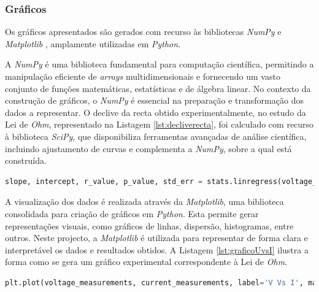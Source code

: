 \subsubsection{Gráficos}
\label{sec:graficos}
Os gráficos apresentados são gerados com recurso às bibliotecas \textit{NumPy} \cite{NumPy} e \textit{Matplotlib} \cite{Matplotlib}, amplamente utilizadas em \textit{Python}. 

A \textit{NumPy} é uma biblioteca fundamental para computação científica, permitindo a manipulação eficiente de \textit{arrays} multidimensionais e fornecendo um vasto conjunto de funções matemáticas, estatísticas e de álgebra linear. No contexto da construção de gráficos, o \textit{NumPy} é essencial na preparação e transformação dos dados a representar. O declive da recta obtido experimentalmente, no estudo da Lei de \textit{Ohm}, representado na Listagem \ref{lst:decliverecta}, foi calculado com recurso à biblioteca \textit{SciPy}, que disponibiliza ferramentas avançadas de análise científica, incluindo ajustamento de curvas e complementa a \textit{NumPy}, sobre a qual está construída.

\begin{minipage}{0.9\linewidth}
	\begin{lstlisting}[language=Python,escapechar=|, caption=Cálculo do declive da recta, label=lst:decliverecta]
		slope, intercept, r_value, p_value, std_err = stats.linregress(voltage_measurements, current_measurements)
	\end{lstlisting}
\end{minipage}

A visualização dos dados é realizada através da \textit{Matplotlib}, uma biblioteca consolidada para criação de gráficos em \textit{Python}. Esta permite gerar representações visuais, como gráficos de linhas, dispersão, histogramas, entre outros. Neste projecto, a \textit{Matplotlib} é utilizada para representar de forma clara e interpretável os dados e resultados obtidos. A Listagem \ref{lst:graficoUvsI} ilustra a forma como se gera um gráfico experimental correspondente à Lei de \textit{Ohm}.

\begin{minipage}{0.9\linewidth}
	\begin{lstlisting}[language=Python,escapechar=|, caption=Gráfico Corrente \textit{vs} Tensão, label=lst:graficoUvsI]
		plt.plot(voltage_measurements, current_measurements, label='V Vs I', marker = 'o')
	\end{lstlisting}
\end{minipage}

